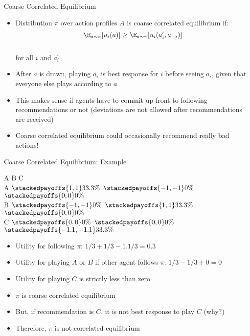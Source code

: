 \documentclass[11pt,aspectratio=169,handout]{beamer}
\begin{document}
  \begin{frame}{Coarse Correlated Equilibrium}
   \begin{itemize}[<+->]
   \setlength{\itemsep}{1em}
    \item Distribution $\pi$ over action profiles $A$ is coarse correlated equilibrium if:
    $$\E_{a \sim \pi}[u_i(a)] \geq \E_{a \sim \pi}[u_i(a_i^\prime, a_{-i})]$$\\
    for all $i$ and $a_i^\prime$
    \item After $a$ is drawn, playing $a_i$ is best response for $i$ \alert{before} seeing $a_i$, given that everyone else plays according to $a$
    \item This makes sense if agents have to commit \alert{up front} to following recommendations or not (deviations are not allowed after recommendations are received)
    \item Coarse correlated equilibrium could occasionally recommend really bad actions!
   \end{itemize}
  \end{frame}


  \begin{frame}{Coarse Correlated Equilibrium: Example}
   \begin{center}\scriptsize
   \renewcommand{\gamestretch}{2.5}
    \hspace{-3.2em}
    \begin{game}{3}{3}
         \> A								\> B     							\> C											\\
     A   \> $\stackedpayoffs{1, 1}{33.3\%}$	\> $\stackedpayoffs{-1, -1}{0\%}$		\> $\stackedpayoffs{0, 0}{0\%}$				\\
     B   \> $\stackedpayoffs{-1,  -1}{0\%}$	\> $\stackedpayoffs{1,  1}{33.3\%}$	\> $\stackedpayoffs{0, 0}{0\%}$				\\
     C   \> $\stackedpayoffs{0,  0}{0\%}$		\> $\stackedpayoffs{0,  0}{0\%}$		\> $\stackedpayoffs{-1.1, -1.1}{33.3\%}$	\\
    \end{game}
   \end{center}
   \vspace{1em}
   \begin{itemize}[<+->] \footnotesize
    \item Utility for following $\pi$: $1/3 + 1/3 - 1.1/3 = 0.3$
    \item Utility for playing $A$ or $B$ if other agent follows $\pi$: $1/3 - 1/3 + 0 = 0$
    \item Utility for playing $C$ is strictly less than zero
    \item $\pi$ \alert{is coarse correlated} equilibrium
    \item But, if recommendation is $C$, it is not best response to play $C$ (why?)
    \item Therefore, $\pi$ \alert{is not correlated equilibrium}
   \end{itemize}
  \end{frame}
\end{document}
